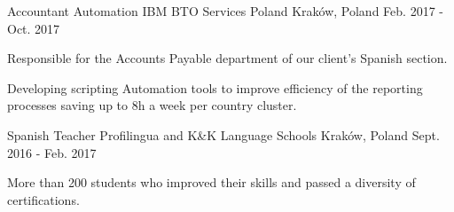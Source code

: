 \begin{cventries}
\cventry
    {Accountant Automation} %
    {IBM BTO Services Poland} %
    {Kraków, Poland} %
    {Feb. 2017 - Oct. 2017} %
    {
        \begin{cvitems} %
            \item {Responsible for the Accounts Payable department of our client's Spanish section.}
            \item {Developing scripting Automation tools to improve efficiency of the reporting processes saving up to 8h a week per country cluster.}
        \end{cvitems}
    }

\cventry
    {Spanish Teacher} %
    {Profilingua and K\&K Language Schools} %
    {Kraków, Poland} %
    {Sept. 2016 - Feb. 2017} %
    {
        \begin{cvitems} %
            \item {More than 200 students who improved their skills and passed a diversity of certifications.}
        \end{cvitems}
    }

\end{cventries}
